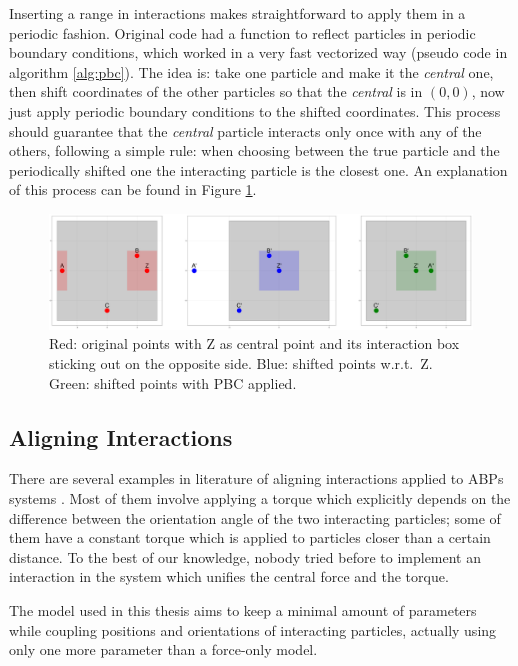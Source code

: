 \documentclass[../../master_thesis_np.tex]{subfiles}
\begin{document}
	Inserting a range in interactions makes straightforward to apply them in a periodic fashion. Original code had a function to reflect particles in periodic boundary conditions, which worked in a very fast vectorized way (pseudo code in algorithm \ref{alg:pbc}). The idea is: take one particle and make it the \emph{central} one, then shift coordinates of the other particles so that the \emph{central} is in $(0,0)$, now just apply periodic boundary conditions to the shifted coordinates. This process should guarantee that the \emph{central} particle interacts only once with any of the others, following a simple rule: when choosing between the true particle and the periodically shifted one the interacting particle is the closest one. An explanation of this process can be found in Figure \ref{fig:periodicint}.
	
	\begin{figure}[htp]
		\centering
		\includegraphics[width=\textwidth]{periodic_interaction.png}
		\caption{Red: original points with Z as central point and its interaction box sticking out on the opposite side. Blue: shifted points w.r.t.\ Z. Green: shifted points with PBC applied.}
		\label{fig:periodicint}
	\end{figure}
	
	\subsection{Aligning Interactions} \label{alignint}

	There are several examples in literature of aligning interactions applied to ABPs systems \cite{martin-gomez_collective_2018, callegari_numerical_2019}. Most of them involve applying a torque which explicitly depends on the difference between the orientation angle of the two interacting particles; some of them have a constant torque which is applied to particles closer than a certain distance. To the best of our knowledge, nobody tried before to implement an interaction in the system which unifies the central force and the torque. 
	
	The model used in this thesis aims to keep a minimal amount of parameters while coupling positions and orientations of interacting particles, actually using only one more parameter than a force-only model.
	
\end{document}

